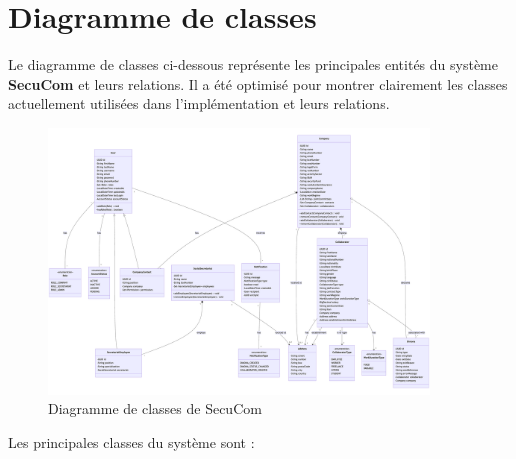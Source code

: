 \section{Diagramme de classes}

\noindent Le diagramme de classes ci-dessous représente les principales entités du système \textbf{SecuCom} et leurs relations. Il a été optimisé pour montrer clairement les classes actuellement utilisées dans l'implémentation et leurs relations.

\begin{figure}[H]
\centering
\includegraphics[width=0.9\textwidth]{ClassDiagram.png}
\caption{Diagramme de classes de SecuCom}
\end{figure}

\vspace{0.5cm}

\noindent Les principales classes du système sont :

